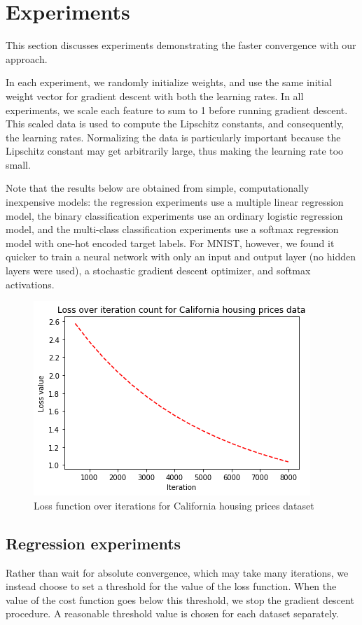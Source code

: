 \documentclass{article}
\begin{document}
\section{Experiments}
This section discusses experiments demonstrating the faster convergence with our approach. 

In each experiment, we randomly initialize weights, and use the same initial weight vector for gradient descent with both the learning rates. In all experiments, we scale each feature to sum to 1 before running gradient descent. This scaled data is used to compute the Lipschitz constants, and consequently, the learning rates. Normalizing the data is particularly important because the Lipschitz constant may get arbitrarily large, thus making the learning rate too small.

Note that the results below are obtained from simple, computationally inexpensive models: the regression experiments use a multiple linear regression model, the binary classification experiments use an ordinary logistic regression model, and the multi-class classification experiments use a softmax regression model with one-hot encoded target labels. For MNIST, however, we found it quicker to train a neural network with only an input and output layer (no hidden layers were used), a stochastic gradient descent optimizer, and softmax activations.

\begin{figure}
    \centering
    \includegraphics[scale=0.5]{cali.png}
    \caption{Loss function over iterations for California housing prices dataset}
    \label{fig:leastsq:1}
\end{figure}

\subsection{Regression experiments} \label{regexpts}
Rather than wait for absolute convergence, which may take many iterations, we instead choose to set a threshold for the value of the loss function. When the value of the cost function goes below this threshold, we stop the gradient descent procedure. A reasonable threshold value is chosen for each dataset separately.
\end{document}
